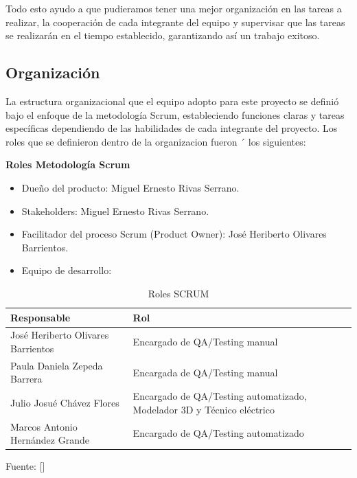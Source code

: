 {{Todo esto ayudo a que pudieramos tener una mejor organización en las tareas a realizar, la cooperación de cada integrante del equipo y supervisar que las tareas se realizarán en el tiempo establecido, garantizando así un trabajo exitoso.
 \subsection{Organización}
 La estructura organizacional que el equipo adopto para este proyecto se definió bajo el enfoque de la metodología Scrum, estableciendo funciones claras y tareas específicas dependiendo de las habilidades de cada integrante del proyecto. Los roles que se definieron dentro de la organizacion fueron ´
los siguientes:

\textbf{Roles Metodología Scrum }

\begin{itemize}
    \item Dueño del producto: Miguel Ernesto Rivas Serrano.
    \item Stakeholders: Miguel Ernesto Rivas Serrano.
    \item Facilitador del proceso Scrum (Product Owner): José Heriberto Olivares Barrientos.

\item {Equipo de desarrollo: }

\end{itemize}
\vspace{1em}

\begin{table}[H]
\centering
\caption{Roles SCRUM}
\label{tab:roles}

\renewcommand{\arraystretch}{1.3} 
\begin{tabular}{|p{5cm}|p{8cm}|} 
\hline
\textbf{Responsable} & \textbf{Rol} \\
\hline
José Heriberto Olivares Barrientos & Encargado de QA/Testing manual \\
\hline
Paula Daniela Zepeda Barrera & Encargada de QA/Testing manual \\
\hline
Julio Josué Chávez Flores & Encargado de QA/Testing automatizado, Modelador 3D y Técnico eléctrico \\
\hline
Marcos Antonio Hernández Grande & Encargado de QA/Testing automatizado \\
\hline
\end{tabular}

\vspace{0.5cm}
\centering
\small Fuente: [\cite{scrum2021}]
\end{table}

}}
